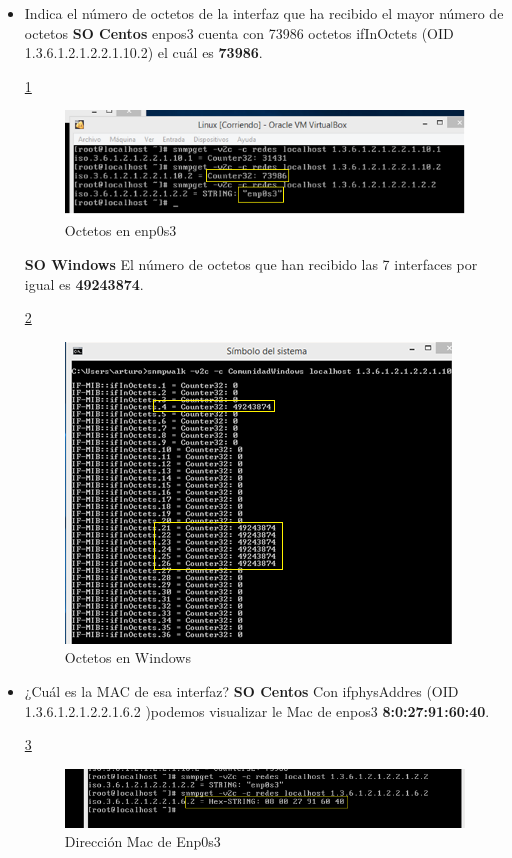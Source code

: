 \documentclass[10pt,a4paper]{book}
\begin{document}
\begin{itemize}
\item Indica el número de octetos  de la interfaz que ha recibido el mayor número de octetos
\textbf{SO Centos}
enpos3 cuenta con 73986 octetos ifInOctets (OID 1.3.6.1.2.1.2.2.1.10.2) el cuál es \textbf{73986}.

\ref{image:Pregunta5C}
 \FloatBarrier
\begin{figure}[htbp!]
		\centering
		    \includegraphics[width=.5 \textwidth]{../images/Pregunta5C.png} 
		\caption{Octetos en enp0s3}
		\label{image:Pregunta5C}
\end{figure}
\FloatBarrier

\textbf{SO Windows}
El número de octetos que han recibido las 7 interfaces por igual es \textbf{49243874}.

 \ref{image:Pregunta5W}
 \FloatBarrier
\begin{figure}[htbp!]
		\centering
		    \includegraphics[width=.5 \textwidth]{../images/Pregunta5W.png} 
		\caption{Octetos en Windows}
		\label{image:Pregunta5W}
\end{figure}
\FloatBarrier

\item ¿Cuál es la MAC de esa interfaz?
\textbf{SO Centos}
Con ifphysAddres (OID 1.3.6.1.2.1.2.2.1.6.2 )podemos visualizar le Mac de enpos3 \textbf{8:0:27:91:60:40}.

 \ref{image:Pregunta6C}
 \FloatBarrier
\begin{figure}[htbp!]
		\centering
		    \includegraphics[width=.5 \textwidth]{../images/Pregunta6C.png} 
		\caption{Dirección Mac de Enp0s3}
		\label{image:Pregunta6C}
\end{figure}
\FloatBarrier


\end{itemize}
\end{document}
